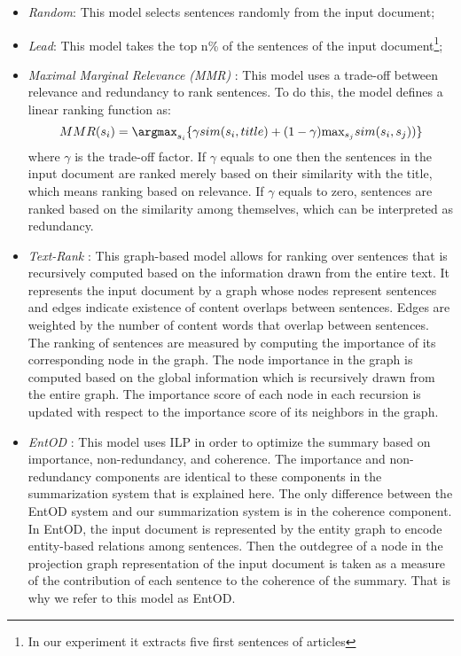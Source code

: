 \begin{itemize}
	\item \emph{Random}: This model selects sentences randomly from the input document;

	\item \emph{Lead}: This model takes the top n\% of the sentences of the input document\footnote{In our experiment it extracts five first sentences of articles};

	\item \emph{Maximal Marginal Relevance (MMR)} \cite{carbonell98}: This model uses a \mbox{trade-off} between relevance and redundancy to rank sentences. 
	 To do this, the model defines a linear ranking function as:
	 \begin{equation}
	 MMR(s_i) = \mathtt{\argmax}_{s_i}\lbrace \gamma sim(s_i,title) + (1-\gamma)\mathtt{\max}_{s_j}sim(s_i,s_j)) \rbrace 
	 \end{equation} 
	 where $\gamma$ is the trade-off factor. 
	 If $\gamma$ equals to one then the sentences in the input document are ranked merely based on their similarity with the title, which means ranking based on relevance. 
	 If $\gamma$ equals to zero, sentences are ranked based on the similarity among themselves, which can be interpreted as redundancy. 

	\item \emph{Text-Rank} \cite{mihalcea04b}: This graph-based model allows for ranking over sentences that is recursively computed based on the information drawn from the entire text. 
	It represents the input document by a graph whose nodes represent sentences and edges indicate existence of content overlaps between sentences. 
	Edges are weighted by the number of content words that overlap between sentences. 
	The ranking of sentences are measured by computing the importance of its corresponding node in the graph. 
	The node importance in the graph is computed based on the global information which is recursively drawn from the entire graph. 
	The importance score of each node in each recursion is updated with respect to the importance score of its neighbors in the graph. 
	
	\item \emph{EntOD} \cite{parveen15a}: 
	This model uses ILP in order to optimize the summary based on importance, non-redundancy, and coherence. 
	The importance and non-redundancy components are identical to these components in the summarization system that is explained here. 
	The only difference between the EntOD system and our summarization system is in the coherence component. 
	In EntOD, the input document is represented by the entity graph to encode \mbox{entity-based} relations among sentences. 
	Then the outdegree of a node in the projection graph representation of the input document is taken as a measure of the contribution of each sentence to the coherence of the summary. 
	That is why we refer to this model as EntOD. 


\end{itemize}
